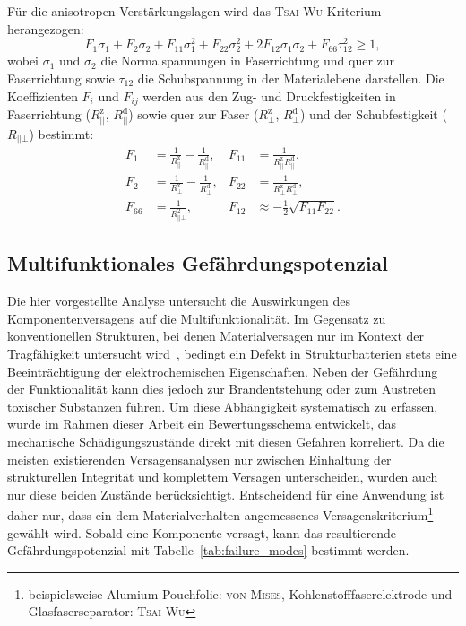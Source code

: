 Für die anisotropen Verstärkungslagen wird das \textsc{Tsai}-\textsc{Wu}-Kriterium~\cite{Tsai1971} herangezogen:
\begin{equation}
F_1 \sigma_1 + F_2 \sigma_2 + F_{11} \sigma_1^2 + F_{22} \sigma_2^2 + 2F_{12} \sigma_1 \sigma_2 + F_{66} \tau_{12}^2 \geq 1,
\end{equation}
wobei $\sigma_1$ und $\sigma_2$ die Normalspannungen in Faserrichtung und quer zur Faserrichtung sowie $\tau_{12}$ die Schubspannung in der Materialebene darstellen. Die Koeffizienten $F_i$ und $F_{ij}$ werden aus den Zug- und Druckfestigkeiten in Faserrichtung ($R^\text{z}_{||}$, $R^\text{d}_{||}$) sowie quer zur Faser ($R^\text{z}_{\bot}$, $R^\text{d}_{\bot}$) und der Schubfestigkeit ($R_{||\bot}$) bestimmt:
\begin{align}
F_1 &= \frac{1}{R^\text{z}_{||}} - \frac{1}{R^\text{d}_{||}}, &
F_{11} &= \frac{1}{R^\text{z}_{||} R^\text{d}_{||}}, \\
F_2 &= \frac{1}{R^\text{z}_{\bot}} - \frac{1}{R^\text{d}_{\bot}}, &
F_{22} &= \frac{1}{R^\text{z}_{\bot} R^\text{d}_{\bot}}, \\
F_{66} &= \frac{1}{R_{||\bot}^2}, &
F_{12} &\approx -\frac{1}{2}\sqrt{F_{11} F_{22}}.
\end{align}

\subsection{Multifunktionales Gefährdungspotenzial}

Die hier vorgestellte Analyse untersucht die Auswirkungen des Komponentenversagens auf die Multifunktionalität. Im Gegensatz zu konventionellen Strukturen, bei denen Materialversagen nur im Kontext der Tragfähigkeit untersucht wird~\cite{boehm2010,boehm2015,boehm2020}, bedingt ein Defekt in Strukturbatterien stets eine Beeinträchtigung der elektrochemischen Eigenschaften. Neben der Gefährdung der Funktionalität kann dies jedoch zur Brandentstehung oder zum Austreten toxischer Substanzen führen. Um diese Abhängigkeit systematisch zu erfassen, wurde im Rahmen dieser Arbeit ein Bewertungsschema entwickelt, das mechanische Schädigungszustände direkt mit diesen Gefahren korreliert. Da die meisten existierenden Versagensanalysen nur zwischen Einhaltung der strukturellen Integrität und komplettem Versagen unterscheiden, wurden auch nur diese beiden Zustände berücksichtigt. Entscheidend für eine Anwendung ist daher nur, dass ein dem Materialverhalten angemessenes Versagenskriterium\footnote{beispielsweise Alumium-Pouchfolie: \textsc{von-Mises}, Kohlenstofffaserelektrode und Glasfaserseparator: \textsc{Tsai}-\textsc{Wu}} gewählt wird. Sobald eine Komponente versagt, kann das resultierende Gefährdungspotenzial mit Tabelle~\ref{tab:failure_modes} bestimmt werden.

